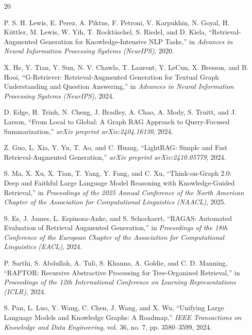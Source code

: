 \documentclass[conference]{IEEEtran}
\begin{document}
\begin{thebibliography}{20}

P. S. H. Lewis, E. Perez, A. Piktus, F. Petroni, V. Karpukhin, N. Goyal, H. K\"{u}ttler, M. Lewis, W. Yih, T. Rockt\"{a}schel, S. Riedel, and D. Kiela, ``Retrieval-Augmented Generation for Knowledge-Intensive NLP Tasks,'' in \textit{Advances in Neural Information Processing Systems (NeurIPS)}, 2020.

X. He, Y. Tian, Y. Sun, N. V. Chawla, T. Laurent, Y. LeCun, X. Bresson, and B. Hooi, ``G-Retriever: Retrieval-Augmented Generation for Textual Graph Understanding and Question Answering,'' in \textit{Advances in Neural Information Processing Systems (NeurIPS)}, 2024.

D. Edge, H. Trinh, N. Cheng, J. Bradley, A. Chao, A. Mody, S. Truitt, and J. Larson, ``From Local to Global: A Graph RAG Approach to Query-Focused Summarization,'' \textit{arXiv preprint arXiv:2404.16130}, 2024.

Z. Guo, L. Xia, Y. Yu, T. Ao, and C. Huang, ``LightRAG: Simple and Fast Retrieval-Augmented Generation,'' \textit{arXiv preprint arXiv:2410.05779}, 2024.

S. Ma, X. Xu, X. Tian, T. Yang, Y. Fang, and C. Xu, ``Think-on-Graph 2.0: Deep and Faithful Large Language Model Reasoning with Knowledge-Guided Retrieval,'' in \textit{Proceedings of the 2025 Annual Conference of the North American Chapter of the Association for Computational Linguistics (NAACL)}, 2025.

S. Es, J. James, L. Espinosa-Anke, and S. Schockaert, ``RAGAS: Automated Evaluation of Retrieval Augmented Generation,'' in \textit{Proceedings of the 18th Conference of the European Chapter of the Association for Computational Linguistics (EACL)}, 2024.

P. Sarthi, S. Abdullah, A. Tuli, S. Khanna, A. Goldie, and C. D. Manning, ``RAPTOR: Recursive Abstractive Processing for Tree-Organized Retrieval,'' in \textit{Proceedings of the 12th International Conference on Learning Representations (ICLR)}, 2024.

S. Pan, L. Luo, Y. Wang, C. Chen, J. Wang, and X. Wu, ``Unifying Large Language Models and Knowledge Graphs: A Roadmap,'' \textit{IEEE Transactions on Knowledge and Data Engineering}, vol. 36, no. 7, pp. 3580--3599, 2024.


\end{thebibliography}
\end{document}
